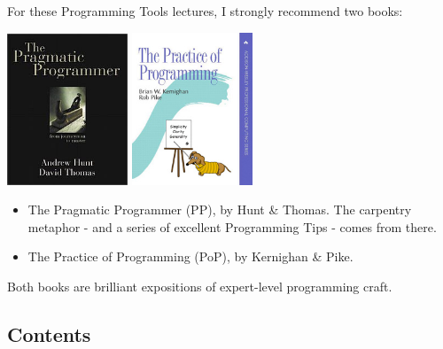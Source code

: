 \documentclass[handout]{beamer}
\begin{document}
\begin{frame}

For these Programming Tools lectures, I strongly recommend two books:

\begin{center}
	\includegraphics[width=0.27\textwidth]{tpp}
	\hspace{2cm}
	\includegraphics[width=0.27\textwidth]{tpop}
\end{center}

    \begin{itemize}
    \item
    \alert{The Pragmatic Programmer (PP)}, by \alert{Hunt \& Thomas}.
    The carpentry metaphor - and a series of excellent Programming Tips -
    comes from there.

    \pause
    \item
    \alert{The Practice of Programming (PoP)}, by \alert{Kernighan \& Pike}.

    \end{itemize}

    Both books are brilliant expositions of expert-level
    programming craft.
\end{frame}

\subsection{Contents}
\end{document}
